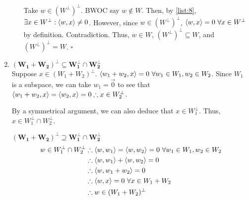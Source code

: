 \documentclass[12pt]{article}
\begin{document}
\begin{enumerate}
\begin{enumerate}
                        Take $w \in (W^\perp)^\perp$.
                        BWOC say $w \notin W$.
                        Then, by \ref{list:8}, $\exists x \in W^\perp: \braket{w, x} \ne 0$.
                        However, since $w \in (W^\perp)^\perp$, $\braket{w, x}=0\ \forall x \in W^\perp$
                        by definition.
                        Contradiction.
                        Thus, $w \in W$, $(W^\perp)^\perp \subseteq W$, and
                        $(W^\perp)^\perp = W$. $\square$
            \end{enumerate}
      \item $\mathbf{(W_1+W_2)^\perp \subseteq W_1^\perp \cap W_2^\perp}$ \\
            Suppose $x \in (W_1+W_2)^\perp$.
            $\braket{w_1+w_2, x}=0\ \forall w_1 \in W_1, w_2 \in W_2$.
            Since $W_1$ is a subspace, we can take $w_1=\vec{0}$ to see that
            $\braket{w_1+w_2, x}=\braket{w_2, x}=0 \therefore x \in W_2^\perp$.

            By a symmetrical argument, we can also deduce that $x \in W_1^\perp$.
            Thus, $x \in W_1^\perp \cap W_2^\perp$.

            $\mathbf{(W_1+W_2)^\perp \supseteq W_1^\perp \cap W_2^\perp}$
            \begin{align*}
                  w \in W_1^\perp \cap W_2^\perp & \therefore \braket{w, w_1}=\braket{w, w_2}=0\ \forall w_1 \in W_1, w_2 \in W_2 \\
                                                 & \therefore \braket{w, w_1}+\braket{w, w_2}=0                                   \\
                                                 & \therefore \braket{w, w_1+w_2}=0                                               \\
                                                 & \therefore \braket{w, x}=0\ \forall x \in W_1+W_2                              \\
                                                 & \therefore w \in (W_1+W_2)^\perp
            \end{align*}


\end{enumerate}
\end{document}
